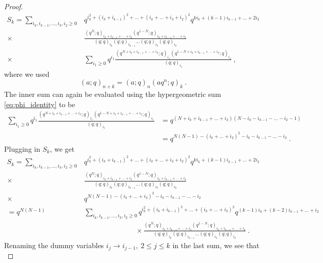 \documentclass[a4paper,10pt]{article}
\begin{document}
\begin{appendix}
\begin{proof}
\begin{equation}
\begin{split}
    S_k=\sum_{i_k,i_{k-1},\dots,i_3,i_2\geq 0}&q^{i_k^2+(i_k+i_{k-1})^2+\dots+(i_k+\dots+i_3+i_2)^2}q^{ki_k+(k-1)i_{k-1}+\dots+2i_2}
    \\
    \times&\frac{(q^N;q)_{i_k+i_{k-1}+\dots +i_2}(q^{1-N};q)_{i_k+i_{k-1}+\dots +i_2}}{(q;q)_{i_k}(q;q)_{i_{k-1}}\dots (q;q)_{i_3}(q;q)_{i_2}}
    \\
    \times&\sum_{i_1\geq 0}q^{i_1}\frac{(q^{N+i_k+i_{k-1}+\dots+i_2};q)_{i_1}(q^{1-N+i_k+i_{k-1}+\dots+i_2};q)_{i_1}}{(q;q)_{i_1}}~,
\end{split}    
\end{equation}
where we used 
\begin{equation}
    (a;q)_{n+k}=(a;q)_n(aq^n;q)_k~.
\end{equation}
The inner sum can again be evaluated using the hypergeometric sum \eqref{eq:phi_identity} to be
\begin{equation}
\begin{split}
\sum_{i_1\geq 0}q^{i_1}\frac{(q^{N+i_k+i_{k-1}+\dots+i_2};q)_{i_1}(q^{1-N+i_k+i_{k-1}+\dots+i_2};q)_{i_1}}{(q;q)_{i_1}}&=q^{(N+i_k+i_{k-1}+\dots+i_2)(N-i_k-i_{k-1}-\dots-i_2-1)}
\\
&=q^{N(N-1)-(i_k+\dots+i_2)^2-i_k-i_{k-1}-\dots-i_2}~.
\end{split}
\end{equation}
Plugging in $S_k$, we get 
\begin{equation}
\begin{split}
    S_k=\sum_{i_k,i_{k-1},\dots,i_3,i_2\geq 0}&q^{i_k^2+(i_k+i_{k-1})^2+\dots+(i_k+\dots+i_3+i_2)^2}q^{ki_k+(k-1)i_{k-1}+\dots+2i_2}
    \\
    \times&\frac{(q^N;q)_{i_k+i_{k-1}+\dots +i_2}(q^{1-N};q)_{i_k+i_{k-1}+\dots +i_2}}{(q;q)_{i_k}(q;q)_{i_{k-1}}\dots (q;q)_{i_3}(q;q)_{i_2}}
    \\
    \times&q^{N(N-1)-(i_k+\dots+i_2)^2-i_k-i_{k-1}-\dots-i_2}
    \\
    =q^{N(N-1)}&\sum_{i_k,i_{k-1},\dots,i_3,i_2\geq 0}q^{i_k^2+(i_k+i_{k-1})^2+\dots+(i_k+\dots+i_3)^2}q^{(k-1)i_k+(k-2)i_{k-1}+\dots+i_2}
    \\
    &\hspace{3cm}\times\frac{(q^N;q)_{i_k+i_{k-1}+\dots +i_2}(q^{1-N};q)_{i_k+i_{k-1}+\dots +i_2}}{(q;q)_{i_k}(q;q)_{i_{k-1}}\dots (q;q)_{i_3}(q;q)_{i_2}}~.
\end{split}    
\end{equation}
Renaming the dummy variables $i_j\to i_{j-1},~2\leq j\leq k$ in the last sum, we see that
\begin{equation}

\end{equation}
\end{proof}
\end{appendix}
\end{document}
